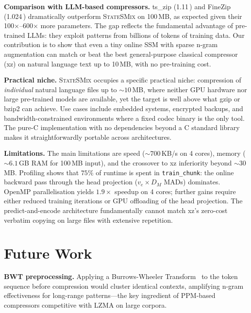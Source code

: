 \documentclass[10pt,twocolumn]{article}
\newcommand{\ssmcomp}{\textsc{StateSMix}}
\newcommand{\bpb}{\text{bpb}}
\begin{document}
\textbf{Comparison with LLM-based compressors.}
ts\_zip (1.11\,\bpb{}) and FineZip (1.024\,\bpb{}) dramatically
outperform \ssmcomp{} on 100\,MB, as expected given their
100$\times$--600$\times$ more parameters.  The gap reflects the
fundamental advantage of pre-trained LLMs: they exploit patterns from
billions of tokens of training data.  Our contribution is to show
that even a tiny online SSM with sparse n-gram augmentation can
match or beat the best general-purpose classical compressor (xz)
on natural language text up to 10\,MB, with no pre-training cost.

\textbf{Practical niche.}
\ssmcomp{} occupies a specific practical niche: compression of
\emph{individual} natural language files up to ${\sim}10$\,MB, where
neither GPU hardware nor large pre-trained models are available, yet
the target is well above what gzip or bzip2 can achieve.  Use cases
include embedded systems, encrypted backups, and bandwidth-constrained
environments where a fixed codec binary is the only tool.
The pure-C implementation with no dependencies beyond a C standard
library makes it straightforwardly portable across architectures.

\textbf{Limitations.}
The main limitations are speed (${\sim}700$\,KB/s on 4 cores),
memory (${\sim}6.1$\,GB RAM for 100\,MB input), and the crossover to
xz inferiority beyond ${\sim}30$\,MB.  Profiling shows that
$75\%$ of runtime is spent in \texttt{train\_chunk}: the online
backward pass through the head projection ($v_e\times D_M$ MADs)
dominates.  OpenMP parallelisation yields $1.9\times$ speedup on
4 cores; further gains require either reduced training iterations
or GPU offloading of the head projection.
The predict-and-encode architecture fundamentally cannot match xz's
zero-cost verbatim copying on large files with extensive repetition.

\section{Future Work}
\label{sec:future}

\textbf{BWT preprocessing.}  Applying a Burrows-Wheeler
Transform~\citep{bwt1994} to the token sequence before compression
would cluster identical contexts, amplifying n-gram effectiveness for
long-range patterns---the key ingredient of PPM-based compressors
competitive with LZMA on large corpora.
\end{document}
